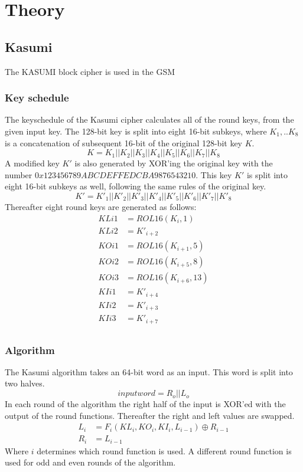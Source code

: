 \chapter{Theory}

\section{Kasumi}

The KASUMI block cipher is used in the GSM 
\subsection{Key schedule}
The keyschedule of the Kasumi cipher calculates all of the round keys,
from the given input key. The 128-bit key is split into eight 16-bit
subkeys, where $K_1,..K_8$ is a concatenation of subsequent 16-bit of
the original 128-bit key $K$.
\[K = K_1 || K_2 || K_3 || K_4 || K_5 || K_6 || K_7 || K_8\]
A modified key $K'$ is also generated by XOR'ing the original key with
the number $0x123456789ABCDEFFEDCBA9876543210$. This key $K'$ is split
into eight 16-bit subkeys as well, following the same rules of the
original key.
\[K' = K'_1 || K'_2 || K'_3 || K'_4 || K'_5 || K'_6 || K'_7 || K'_8\]
Thereafter eight round keys are generated as follows:
\begin{align*}
  KLi1 &= ROL16(K_i,1)\\
  KLi2 &= K'_{i+2}\\
  KOi1 &= ROL16(K_{i + 1},5)\\
  KOi2 &= ROL16(K_{i + 5},8)\\
  KOi3 &= ROL16(K_{i + 6},13)\\
  KIi1 &= K'_{i+4}\\
  KIi2 &= K'_{i+3}\\
  KIi3 &= K'_{i+7}\\
\end{align*}

\subsection{Algorithm}
The Kasumi algorithm takes an 64-bit word as an input. This word is
split into two halves.
\[ inputword = R_o || L_o\]
In each round of the algorithm the right half of the input is XOR'ed
with the output of the round functions. Thereafter the right and left
values are swapped. 
\begin{align*}
  L_i &= F_i(KL_i,KO_i,KI_i,L_{i - 1}) \oplus R_{i - 1} \\
  R_i &= L_{i - 1}
\end{align*}
Where $i$ determines which round function is used. A different round
function is used for odd and even rounds of the algorithm.

